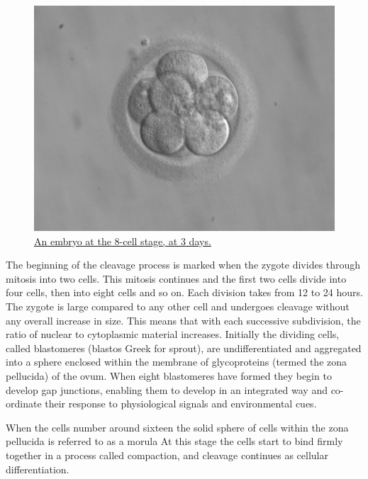 \begin{figure}

{\centering \includegraphics[width=0.7\linewidth]{./figures/development/Embryo,_8_cells} 

}

\caption{\href{https://commons.wikimedia.org/wiki/File:Embryo,_8_cells.jpg}{An embryo at the 8-cell stage, at 3 days.}}\label{fig:eightcellembryo}
\end{figure}

The beginning of the cleavage process is marked when the zygote divides through mitosis into two cells. This mitosis continues and the first two cells divide into four cells, then into eight cells and so on. Each division takes from 12 to 24 hours. The zygote is large compared to any other cell and undergoes cleavage without any overall increase in size. This means that with each successive subdivision, the ratio of nuclear to cytoplasmic material increases. Initially the dividing cells, called blastomeres (blastos Greek for sprout), are undifferentiated and aggregated into a sphere enclosed within the membrane of glycoproteins (termed the zona pellucida) of the ovum. When eight blastomeres have formed they begin to develop gap junctions, enabling them to develop in an integrated way and co-ordinate their response to physiological signals and environmental cues.

When the cells number around sixteen the solid sphere of cells within the zona pellucida is referred to as a morula At this stage the cells start to bind firmly together in a process called compaction, and cleavage continues as cellular differentiation.

